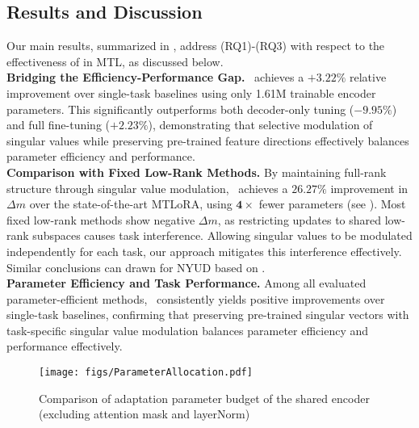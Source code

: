\subsection{Results and Discussion}
  \label{subsec:results}
Our main results, summarized in , address (RQ1)-(RQ3) with respect to the effectiveness of \ourmethod{} in MTL, as discussed below.
\\
\noindent\textbf{Bridging the Efficiency-Performance Gap.} \ourmethod\ achieves a \(\mathbf{+3.22\%}\) relative improvement over single-task baselines using only 1.61M trainable encoder parameters. This significantly outperforms both decoder-only tuning (\(-9.95\%\)) and full fine-tuning (\(+2.23\%\)), demonstrating that selective modulation of singular values while preserving pre-trained feature directions effectively balances parameter efficiency and performance.
\\
\noindent\textbf{Comparison with Fixed Low-Rank Methods.}
By maintaining full-rank structure through singular value modulation, \ourmethod\ achieves a \(26.27\%\) improvement in \(\Delta m\) over the state-of-the-art MTLoRA, using \(\mathbf{4\times}\) fewer parameters (see ). Most fixed low-rank methods show negative \(\Delta m\), as restricting updates to shared low-rank subspaces causes task interference. Allowing singular values to be modulated independently for each task, our approach mitigates this interference effectively. Similar conclusions can drawn for NYUD based on .
\\
\noindent\textbf{Parameter Efficiency and Task Performance.}
Among all evaluated parameter-efficient methods, \ourmethod\ consistently yields positive improvements over single-task baselines, confirming that preserving pre-trained singular vectors with task-specific singular value modulation balances parameter efficiency and performance effectively.

\begin{figure}[ht]
    \centering
    \texttt{[image: figs/ParameterAllocation.pdf]}
    \caption{Comparison of adaptation parameter budget of the shared encoder (excluding attention mask and layerNorm)}
    \label{fig:parameterallocation}
\end{figure}

